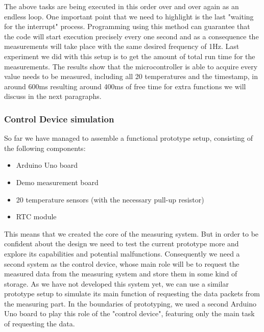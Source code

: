 The above tasks are being executed in this order over and over again as an endless loop. One important point that we need to highlight is the last "waiting for the interrupt" process. Programming using this method can guarantee that the code will start execution precisely every one second and as a consequence the measurements will take place with the same desired frequency of 1Hz. Last experiment we did with this setup is to get the amount of total run time for the measurements. The results show that the microcontroller is able to acquire every value needs to be measured, including all 20 temperatures and the timestamp, in around 600ms resulting around 400ms of free time for extra functions we will discuss in the next paragraphs.


\subsubsection{Control Device simulation}
So far we have managed to assemble a functional prototype setup, consisting of the following components:

\begin{itemize}
    \item Arduino Uno board
    \item Demo measurement board
    \item 20 temperature sensors (with the necessary pull-up resistor)
    \item RTC module
\end{itemize}

This means that we created the core of the measuring system. But in order to be confident about the design we need to test the current prototype more and explore its capabilities and potential malfunctions. Consequently we need a second system as the control device, whose main role will be to request the measured data from the measuring system and store them in some kind of storage. As we have not developed this system yet, we can use a similar prototype setup to simulate its main function of requesting the data packets from the measuring part. In the boundaries of prototyping, we used a second Arduino Uno board to play this role of the "control device", featuring only the main task of requesting the data.

